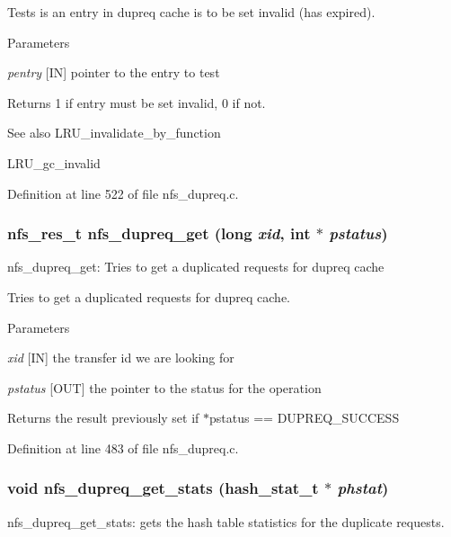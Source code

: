 Tests is an entry in dupreq cache is to be set invalid (has expired).


\begin{DoxyParams}{Parameters}
\item[{\em pentry}][IN] pointer to the entry to test\end{DoxyParams}
\begin{DoxyReturn}{Returns}
1 if entry must be set invalid, 0 if not.
\end{DoxyReturn}
\begin{DoxySeeAlso}{See also}
LRU\_\-invalidate\_\-by\_\-function 

LRU\_\-gc\_\-invalid 
\end{DoxySeeAlso}


Definition at line 522 of file nfs\_\-dupreq.c.
\subsubsection[{nfs\_\-dupreq\_\-get}]{\setlength{\rightskip}{0pt plus 5cm}nfs\_\-res\_\-t nfs\_\-dupreq\_\-get (long {\em xid}, \/  int $\ast$ {\em pstatus})}\label{nfs__dupreq_8c_af44969aca0de15c4a2079988b6e6c266}
nfs\_\-dupreq\_\-get: Tries to get a duplicated requests for dupreq cache

Tries to get a duplicated requests for dupreq cache.


\begin{DoxyParams}{Parameters}
\item[{\em xid}][IN] the transfer id we are looking for \item[{\em pstatus}][OUT] the pointer to the status for the operation\end{DoxyParams}
\begin{DoxyReturn}{Returns}
the result previously set if $\ast$pstatus == DUPREQ\_\-SUCCESS 
\end{DoxyReturn}


Definition at line 483 of file nfs\_\-dupreq.c.
\subsubsection[{nfs\_\-dupreq\_\-get\_\-stats}]{\setlength{\rightskip}{0pt plus 5cm}void nfs\_\-dupreq\_\-get\_\-stats (hash\_\-stat\_\-t $\ast$ {\em phstat})}\label{nfs__dupreq_8c_aade2ed32dcdd7eb6990c8f99f5c81370}
nfs\_\-dupreq\_\-get\_\-stats: gets the hash table statistics for the duplicate requests.

